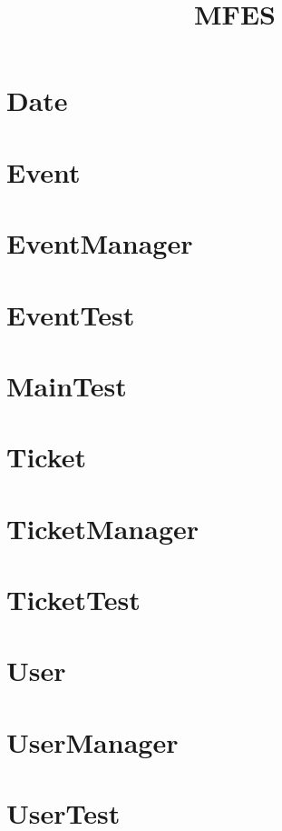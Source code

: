 \documentclass{article}
\begin{document}
\title{MFES}
\author{}
\maketitle
\tableofcontents

\section{Date}

\section{Event}

\section{EventManager}

\section{EventTest}

\section{MainTest}

\section{Ticket}

\section{TicketManager}

\section{TicketTest}

\section{User}

\section{UserManager}

\section{UserTest}

\end{document}
